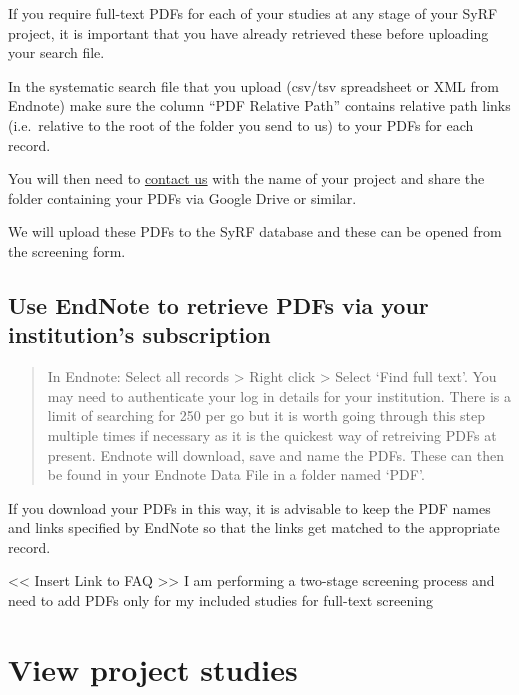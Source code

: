 \documentclass[
]{book}
\begin{document}
If you require full-text PDFs for each of your studies at any stage of your SyRF project, it is important that you have already retrieved these before uploading your search file.

In the systematic search file that you upload (csv/tsv spreadsheet or XML from Endnote) make sure the column ``PDF Relative Path'' contains relative path links (i.e.~relative to the root of the folder you send to us) to your PDFs for each record.

You will then need to \href{syrf.info@ed.ac.uk}{contact us} with the name of your project and share the folder containing your PDFs via Google Drive or similar.

We will upload these PDFs to the SyRF database and these can be opened from the screening form.

\hypertarget{use-endnote-to-retrieve-pdfs-via-your-institutions-subscription}{%
\subsection{Use EndNote to retrieve PDFs via your institution's subscription}\label{use-endnote-to-retrieve-pdfs-via-your-institutions-subscription}}

\begin{quote}
In Endnote: Select all records \textgreater{} Right click \textgreater{} Select `Find full text'. You may need to authenticate your log in details for your institution. There is a limit of searching for 250 per go but it is worth going through this step multiple times if necessary as it is the quickest way of retreiving PDFs at present. Endnote will download, save and name the PDFs. These can then be found in your Endnote Data File in a folder named `PDF'.
\end{quote}

If you download your PDFs in this way, it is advisable to keep the PDF names and links specified by EndNote so that the links get matched to the appropriate record.

\textless{}\textless{} Insert Link to FAQ \textgreater{}\textgreater{}
I am performing a two-stage screening process and need to add PDFs only for my included studies for full-text screening

\hypertarget{view-project-studies}{%
\section{View project studies}\label{view-project-studies}}
\end{document}
